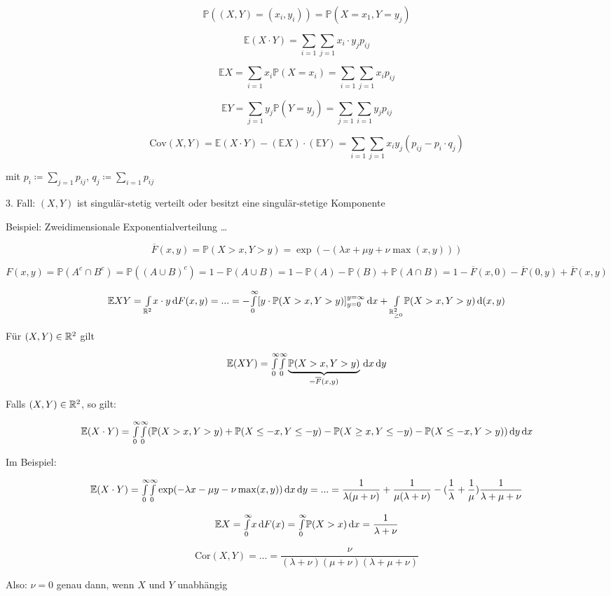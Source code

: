 \documentclass{cheat-sheet}
\renewcommand{\P}{\mathbb{P}} %
\newcommand{\E}{\mathbb{E}} %
\newcommand{\Cov}{\mathrm{Cov}} %
\newcommand{\cor}{\mathrm{Cor}} %
\begin{document}
\[ \P((X, Y) = (x_i, y_i)) = \P(X=x_1, Y=y_j) \]

\[ \E(X \cdot Y) = \sum_{i=1} \sum_{j=1} x_i \cdot y_j p_{ij} \]

\[ \E X = \sum_{i=1} x_i \P(X = x_i) = \sum_{i=1} \sum_{j=1} x_i p_{ij} \]

\[ \E Y = \sum_{j=1} y_j \P(Y = y_j) = \sum_{j=1} \sum_{i=1} y_j p_{ij} \]

\[ \Cov(X, Y) = \E (X \cdot Y) - (\E X) \cdot (\E Y) = \sum_{i=1} \sum_{j=1} x_i y_j (p_{ij} - p_i \cdot q_j) \]

mit $p_i \coloneqq \sum_{j=1} p_{ij}$, $q_j \coloneqq \sum_{i=1} p_{ij}$

3. Fall: $(X, Y)$ ist singulär-stetig verteilt oder besitzt eine singulär-stetige Komponente

Beispiel: Zweidimensionale Exponentialverteilung \ldots

\[ \overline{F}(x,y) = \P(X > x, Y > y) = \exp \left( -(\lambda x + \mu y + \nu \max(x,y)) \right) \]

\[ F(x, y) = \P(A^c \cap B^c) = \P((A \cup B)^c) = 1 - \P(A \cup B) = 1 - \P(A) - \P(B) + \P(A \cap B) = 1 - \overline{F}(x,0) - \overline{F}(0,y) + \overline{F}(x,y) \]

\[ \E XY = \Int{\R^2}{}{x \cdot y}{F(x,y)} = ... = - \Int{0}{\infty}{[y \cdot \P(X > x, Y > y)]_{y=0}^{y=\infty}}{x} + \Int{\R_{\geq 0}^2}{}{\P(X > x, Y > y)}{(x,y)} \]

Für $(X, Y) \in \mathbb{R}^2$ gilt

\[ \E (XY) = \Int{0}{\infty}{\Int{0}{\infty}{\underbrace{\P(X > x, Y > y)}_{= \overline{F}(x,y)}}{x}}{y} \]

Falls $(X, Y) \in \mathbb{R}^2$, so gilt:

\[ \E (X \cdot Y) = \Int{0}{\infty}{\Int{0}{\infty}{(\P(X > x, Y > y) + \P(X \leq -x, Y \leq -y) - \P(X \geq x, Y \leq -y) - \P(X \leq -x, Y > y))}{y}}{x} \]

Im Beispiel:

\[ \E (X \cdot Y) = \Int{0}{\infty}{\Int{0}{\infty}{\exp(-\lambda x - \mu y - \nu \max(x,y))}{x}}{y} = ... = \frac{1}{\lambda (\mu + \nu)} + \frac{1}{\mu (\lambda + \nu)} - (\frac{1}{\lambda} + \frac{1}{\mu}) \frac{1}{\lambda + \mu + \nu} \]

\[ \E X = \Int{0}{\infty}{x}{F(x)} = \Int{0}{\infty}{\P(X > x)}{x} = \frac{1}{\lambda + \nu} \]

\[ \cor(X,Y) = ... = \frac{\nu}{(\lambda + \nu) (\mu + \nu) (\lambda + \mu + \nu)} \]

Also: $\nu = 0$ genau dann, wenn $X$ und $Y$ unabhängig
\end{document}
